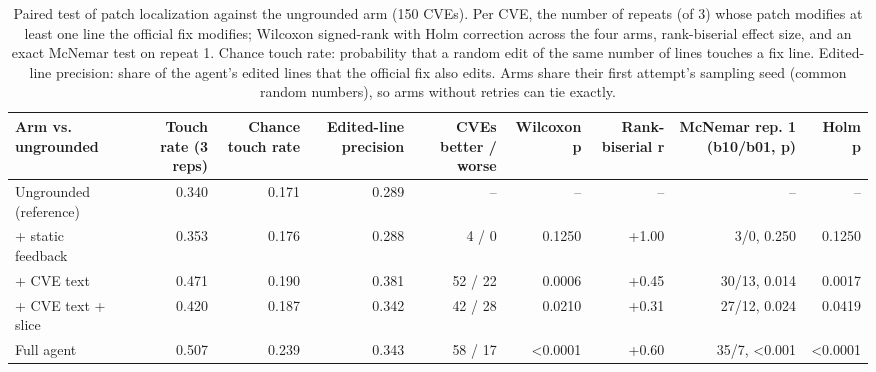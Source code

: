 \begin{table}[t]
\centering\small
\caption{Paired test of patch localization against the ungrounded arm (150 CVEs). Per CVE, the number of repeats (of 3) whose patch modifies at least one line the official fix modifies; Wilcoxon signed-rank with Holm correction across the four arms, rank-biserial effect size, and an exact McNemar test on repeat 1. Chance touch rate: probability that a random edit of the same number of lines touches a fix line. Edited-line precision: share of the agent's edited lines that the official fix also edits. Arms share their first attempt's sampling seed (common random numbers), so arms without retries can tie exactly.}
\label{tab:t6}
\begin{tabular}{lrrrrrrrr}
\toprule
Arm vs. ungrounded & Touch rate (3 reps) & Chance touch rate & Edited-line precision & CVEs better / worse & Wilcoxon p & Rank-biserial r & McNemar rep. 1 (b10/b01, p) & Holm p \\
\midrule
Ungrounded (reference) & 0.340 & 0.171 & 0.289 & -- & -- & -- & -- & -- \\
+ static feedback & 0.353 & 0.176 & 0.288 & 4 / 0 & 0.1250 & +1.00 & 3/0, 0.250 & 0.1250 \\
+ CVE text & 0.471 & 0.190 & 0.381 & 52 / 22 & 0.0006 & +0.45 & 30/13, 0.014 & 0.0017 \\
+ CVE text + slice & 0.420 & 0.187 & 0.342 & 42 / 28 & 0.0210 & +0.31 & 27/12, 0.024 & 0.0419 \\
Full agent & 0.507 & 0.239 & 0.343 & 58 / 17 & <0.0001 & +0.60 & 35/7, <0.001 & <0.0001 \\
\bottomrule
\end{tabular}
\end{table}
